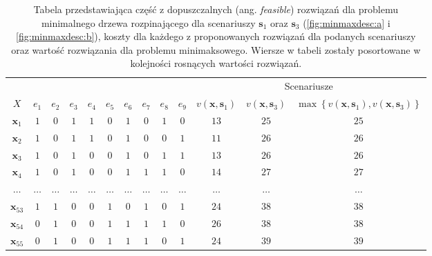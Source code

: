\begin{table}[!htbp]
	\caption{Tabela przedstawiająca część z dopuszczalnych (ang. \textit{feasible}) rozwiązań dla problemu minimalnego drzewa rozpinającego dla scenariuszy $\textbf{s}_{1}$ oraz $\textbf{s}_{3}$ (\ref{fig:minmaxdesc:a} i \ref{fig:minmaxdesc:b}), koszty dla każdego z proponowanych rozwiązań dla podanych scenariuszy oraz wartość rozwiązania dla problemu minimaksowego. Wiersze w tabeli zostały posortowane w kolejności rosnących wartości rozwiązań.}
	\label{tab:minmaxexample}
	\begin{tabular}{ccccccccccccc}
		\cline{11-13}
		\multicolumn{2}{l}{}       &         &         &         &         &         &         &         &         & \multicolumn{3}{c}{Scenariusze}                                                                                                                                                                                              \\
		$X$              & $e_{1}$ & $e_{2}$ & $e_{3}$ & $e_{4}$ & $e_{5}$ & $e_{6}$ & $e_{7}$ & $e_{8}$ & $e_{9}$ & $v \left( \textbf{x}, \textbf{s}_{1} \right) $ & $ v \left( \textbf{x}, \textbf{s}_{3} \right) $ & $\max \left\{ v \left( \textbf{x}, \textbf{s}_{1} \right), v \left( \textbf{x}, \textbf{s}_{3} \right) \right\} $ \\
		$\textbf{x}_{1}$ & $1$     & $0$     & $1$     & $1$     & $0$     & $1$     & $0$     & $1$	&	$0$	&	$13$	&	$25$	&	$25$	\\
		$\textbf{x}_{2}$ & $1$     & $0$     & $1$     & $1$     & $0$     & $1$     & $0$     & $0$	&	$1$	&	$11$	&	$26$	&	$26$	\\
		$\textbf{x}_{3}$ & $1$     & $0$     & $1$     & $0$     & $0$     & $1$     & $0$     & $1$	&	$1$	&	$13$	&	$26$	&	$26$	\\
		$\textbf{x}_{4}$ & $1$     & $0$     & $1$     & $0$     & $0$     & $1$     & $1$     & $1$	&	$0$	&	$14$	&	$27$	&	$27$	\\
		$\dots$ & $\dots$     & $\dots$     & $\dots$     & $\dots$     & $\dots$     & $\dots$     & $\dots$     & $\dots$	&	$\dots$	&	$\dots$	&	$\dots$	&	$\dots$	\\
		$\textbf{x}_{53}$ & $1$     & $1$     & $0$     & $0$     & $1$     & $0$     & $1$     & $0$	&	$1$	&	$24$	&	$38$	&	$38$	\\
		$\textbf{x}_{54}$ & $0$     & $1$     & $0$     & $0$     & $1$     & $1$     & $1$     & $1$	&	$0$	&	$26$	&	$38$	&	$38$	\\
		$\textbf{x}_{55}$ & $0$     & $1$     & $0$     & $0$     & $1$     & $1$     & $1$     & $0$	&	$1$	&	$24$	&	$39$	&	$39$	\\
		 \hline
	\end{tabular}
\end{table}

